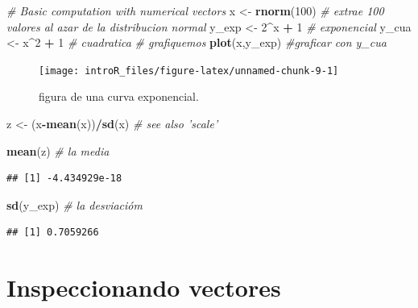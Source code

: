 \documentclass[
]{book}
\newenvironment{Shaded}{\begin{snugshade}}{\end{snugshade}}
\newcommand{\CommentTok}[1]{\textcolor[rgb]{0.56,0.35,0.01}{\textit{#1}}}
\newcommand{\DecValTok}[1]{\textcolor[rgb]{0.00,0.00,0.81}{#1}}
\newcommand{\KeywordTok}[1]{\textcolor[rgb]{0.13,0.29,0.53}{\textbf{#1}}}
\newcommand{\NormalTok}[1]{#1}
\newcommand{\OperatorTok}[1]{\textcolor[rgb]{0.81,0.36,0.00}{\textbf{#1}}}
\newcommand{\StringTok}[1]{\textcolor[rgb]{0.31,0.60,0.02}{#1}}
\begin{document}
\begin{Shaded}
\begin{Highlighting}[]
\CommentTok{# Basic computation with numerical vectors}
\NormalTok{x <-}\StringTok{ }\KeywordTok{rnorm}\NormalTok{(}\DecValTok{100}\NormalTok{) }\CommentTok{# extrae 100 valores al azar de la distribucion normal}
\NormalTok{y_exp <-}\StringTok{ }\DecValTok{2}\OperatorTok{^}\NormalTok{x }\OperatorTok{+}\StringTok{ }\DecValTok{1} \CommentTok{# exponencial}
\NormalTok{y_cua <-}\StringTok{ }\NormalTok{x}\OperatorTok{^}\DecValTok{2} \OperatorTok{+}\StringTok{ }\DecValTok{1} \CommentTok{# cuadratica}
\CommentTok{# grafiquemos}
\KeywordTok{plot}\NormalTok{(x,y_exp) }\CommentTok{#graficar con y_cua}
\end{Highlighting}
\end{Shaded}

\begin{figure}

{\centering \texttt{[image: introR\_files/figure-latex/unnamed-chunk-9-1]} 

}

\caption{figura de una curva exponencial.}\label{fig:unnamed-chunk-9}
\end{figure}

\begin{Shaded}
\begin{Highlighting}[]
\NormalTok{z <-}\StringTok{ }\NormalTok{(x}\OperatorTok{-}\KeywordTok{mean}\NormalTok{(x))}\OperatorTok{/}\KeywordTok{sd}\NormalTok{(x)  }\CommentTok{# see also 'scale'}

\KeywordTok{mean}\NormalTok{(z) }\CommentTok{# la media}
\end{Highlighting}
\end{Shaded}

\begin{verbatim}
## [1] -4.434929e-18
\end{verbatim}

\begin{Shaded}
\begin{Highlighting}[]
\KeywordTok{sd}\NormalTok{(y_exp) }\CommentTok{# la desviacióm}
\end{Highlighting}
\end{Shaded}

\begin{verbatim}
## [1] 0.7059266
\end{verbatim}

\hypertarget{inspeccionando-vectores}{%
\section{Inspeccionando vectores}\label{inspeccionando-vectores}}
\end{document}
